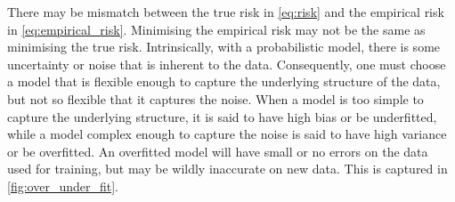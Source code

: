 There may be mismatch between the true risk in \cref{eq:risk} and the empirical risk in \cref{eq:empirical_risk}.
Minimising the empirical risk may not be the same as minimising the true risk.
Intrinsically, with a probabilistic model, there is some uncertainty or noise that is inherent to the data.
Consequently, one must choose a model that is flexible enough to capture the underlying structure of the data, but not so flexible that it captures the noise.
When a model is too simple to capture the underlying structure, it is said to have high bias or be underfitted, while a model complex enough to capture the noise is said to have high variance or be overfitted.
An overfitted model will have small or no errors on the data used for training, but may be wildly inaccurate on new data.
This is captured in \cref{fig:over_under_fit}.

